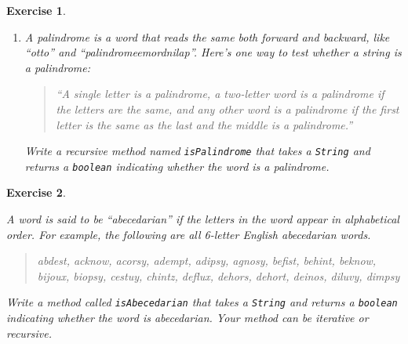 \documentclass[12pt]{book}
\theoremstyle{exercise}
\newtheorem{exercise}{Exercise}[chapter]
\newcommand{\java}[1]{\verb"#1"}
\begin{document}
\begin{exercise}
\begin{enumerate}
\begin{code}
    String backwards = reverseString("coffee");
    System.out.println(backwards);
\end{code}

For example, the output of the above code should be:

\begin{stdout}
eeffoc
\end{stdout}


\item A palindrome is a word that reads the same both forward and backward, like ``otto'' and ``palindromeemordnilap''.
Here's one way to test whether a string is a palindrome:

\begin{quotation}
\noindent
``A single letter is a palindrome, a two-letter word is a palindrome if the letters are the same, and any other word is a palindrome if the first letter is the same as the last and the middle is a palindrome.''
\end{quotation}

Write a recursive method named \java{isPalindrome} that takes a \java{String} and returns a \java{boolean} indicating whether the word is a palindrome.

\end{enumerate}

\end{exercise}


\begin{exercise}
\label{abecedarian}

A word is said to be ``abecedarian'' if the letters in the word appear in alphabetical order.
For example, the following are all 6-letter English abecedarian words.

\begin{quote}
abdest, acknow, acorsy, adempt, adipsy, agnosy, befist, behint, %
beknow, bijoux, biopsy, cestuy, chintz, deflux, dehors, dehort, %
deinos, diluvy, dimpsy %
\end{quote}

Write a method called \java{isAbecedarian} that takes a \java{String} and returns a \java{boolean} indicating whether the word is abecedarian.
Your method can be iterative or recursive.

\end{exercise}
\end{document}
